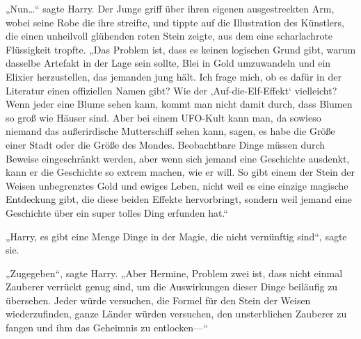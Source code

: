 „Nun…“ sagte Harry.
Der Junge griff über ihren eigenen ausgestreckten Arm, wobei seine Robe die ihre streifte, und tippte auf die Illustration des Künstlers, die einen unheilvoll glühenden roten Stein zeigte, aus dem eine scharlachrote Flüssigkeit tropfte. „Das Problem ist, dass es keinen logischen Grund gibt, warum dasselbe Artefakt in der Lage sein sollte, Blei in Gold umzuwandeln und ein Elixier herzustellen, das jemanden jung hält. Ich frage mich, ob es dafür in der Literatur einen offiziellen Namen gibt? Wie der ‚Auf-die-Elf-Effekt‘ vielleicht? Wenn jeder eine Blume sehen kann, kommt man nicht damit durch, dass Blumen so groß wie Häuser sind. Aber bei einem UFO-Kult kann man, da sowieso niemand das außerirdische Mutterschiff sehen kann, sagen, es habe die Größe einer Stadt oder die Größe des Mondes. Beobachtbare Dinge müssen durch Beweise eingeschränkt werden, aber wenn sich jemand eine Geschichte ausdenkt, kann er die Geschichte so extrem machen, wie er will. So gibt einem der Stein der Weisen unbegrenztes Gold und ewiges Leben, nicht weil es eine einzige magische Entdeckung gibt, die diese beiden Effekte hervorbringt, sondern weil jemand eine Geschichte über ein super tolles Ding erfunden hat.“

„Harry, es gibt eine Menge Dinge in der Magie, die nicht vernünftig sind“, sagte sie.

„Zugegeben“, sagte Harry. „Aber Hermine, Problem zwei ist, dass nicht einmal Zauberer verrückt genug sind, um die Auswirkungen dieser Dinge beiläufig zu übersehen. Jeder würde versuchen, die Formel für den Stein der Weisen wiederzufinden, ganze Länder würden versuchen, den unsterblichen Zauberer zu fangen und ihm das Geheimnis zu entlocken—“


